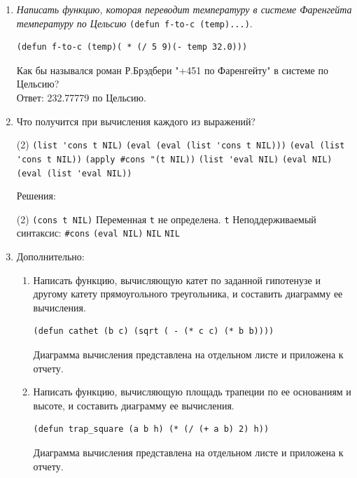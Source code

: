 \documentclass[12pt]{report}
\begin{document}
\begin{enumerate}[wide=0pt]
\begin{tasks}[label=\arabic*), item-indent=3pt, after-item-skip=1pt]
\end{tasks}
\item \textit{Написать функцию, которая переводит температуру в системе Фаренгейта
температуру по Цельсию} \lstinline|(defun f-to-c (temp)...)|.
\begin{lstlisting}
(defun f-to-c (temp)( * (/ 5 9)(- temp 32.0)))
\end{lstlisting}
Как бы назывался роман Р.Брэдбери "+451 по Фаренгейту" в системе по Цельсию? \\
Ответ: 232.77779 по Цельсию.
\item Что получится при вычисления каждого из выражений?
\begin{tasks}[label=\arabic*), item-indent=3pt, after-item-skip=1pt](2)
	\task \lstinline|(list 'cons t NIL)|
	\task \lstinline|(eval (eval (list 'cons t NIL)))|
	\task \lstinline|(eval (list 'cons t NIL))|
	\task \lstinline|(apply #cons "(t NIL))|
	\task \lstinline|(list 'eval NIL)|
	\task \lstinline|(eval NIL)|
	\task \lstinline|(eval (list 'eval NIL))|
\end{tasks}
Решения:
\begin{tasks}[label=\arabic*), item-indent=3pt, after-item-skip=1pt](2)
	\task \lstinline|(cons t NIL)|
	\task Переменная \lstinline|t| не определена.
	\task \lstinline|t|
	\task Неподдерживаемый синтаксис: \lstinline|#cons|
	\task \lstinline|(eval NIL)|
	\task \lstinline|NIL|
	\task \lstinline|NIL|
\end{tasks}
\item Дополнительно:
\begin{enumerate}[wide=0pt]
	\item Написать функцию, вычисляющую катет по заданной гипотенузе и другому катету
	прямоугольного треугольника, и составить диаграмму ее вычисления. \\
	\begin{lstlisting}
(defun cathet (b c) (sqrt ( - (* c c) (* b b))))
	\end{lstlisting}
	Диаграмма вычисления представлена на отдельном листе и приложена к отчету.
	\item Написать функцию, вычисляющую площадь трапеции по ее основаниям и
	высоте, и составить диаграмму ее вычисления. \\
	\begin{lstlisting}
(defun trap_square (a b h) (* (/ (+ a b) 2) h))
	\end{lstlisting}
	Диаграмма вычисления представлена на отдельном листе и приложена к отчету.
\end{enumerate}
\end{enumerate}
\end{document}
